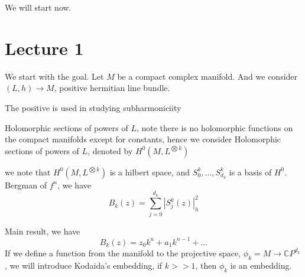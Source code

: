 We will start now.


\chapter{Lecture 1}
We start with the goal. Let $M$ be a compact complex manifold. And we consider $(L, h)\to M$, positive hermitian line bundle.
\begin{remark}
    The positive is used in studying subharmoniciity
\end{remark}

Holomorphic sections of powers of $L$, note there is no holomorphic functions on the compact manifolds except for constants, hence we consider Holomorphic sections of powers of $L$, denoted by $H^0(M, L^{\bigotimes k})$

we note that $H^0(M, L^{\bigotimes k})$ is a hilbert space, and 
${S_0^k,... , S_{d_k}^k}$ is a basis of $H^0$.
Bergman of $f^n$, we have 
\begin{equation}
    B_k(z)=\sum_{j=0}^{d_k}|S_j^k(z)|_h^2
\end{equation}

Main result, we have
\begin{equation*}
    B_k(z)=z_0k^n+a_1k^{n-1}+...
\end{equation*}
If we define a function from the manifold to the projective space,
$\phi_k=M\to\mathbb{C}P^{d_k}$, we will introduce Kodaida's embedding, if $k>>1$, then $\phi_k$ is an embedding.

